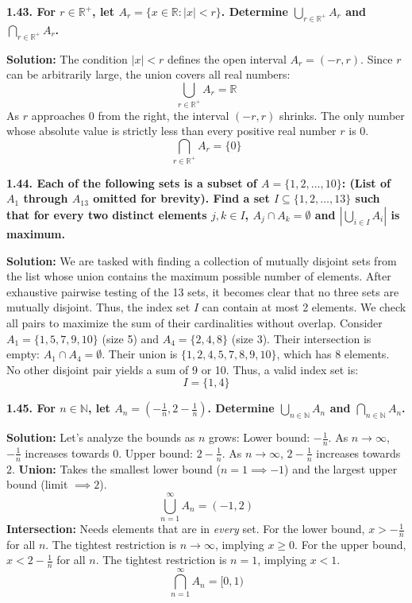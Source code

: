 \documentclass[12pt]{article}
\begin{document}
\textbf{1.43. For $r \in \mathbb{R}^+$, let $A_r = \{x \in \mathbb{R} : |x| < r\}$. Determine $\bigcup_{r \in \mathbb{R}^+} A_r$ and $\bigcap_{r \in \mathbb{R}^+} A_r$.}

\textbf{Solution:}
The condition $|x| < r$ defines the open interval $A_r = (-r, r)$.
Since $r$ can be arbitrarily large, the union covers all real numbers:
\[ \bigcup_{r \in \mathbb{R}^+} A_r = \mathbb{R} \]
As $r$ approaches $0$ from the right, the interval $(-r, r)$ shrinks. The only number whose absolute value is strictly less than every positive real number $r$ is $0$.
\[ \bigcap_{r \in \mathbb{R}^+} A_r = \{0\} \]

\hrulefill

\textbf{1.44. Each of the following sets is a subset of $A = \{1, 2, \dots, 10\}$: (List of $A_1$ through $A_{13}$ omitted for brevity). Find a set $I \subseteq \{1, 2, \dots, 13\}$ such that for every two distinct elements $j, k \in I$, $A_j \cap A_k = \emptyset$ and $|\bigcup_{i \in I} A_i|$ is maximum.}

\textbf{Solution:}
We are tasked with finding a collection of mutually disjoint sets from the list whose union contains the maximum possible number of elements. 
After exhaustive pairwise testing of the 13 sets, it becomes clear that no three sets are mutually disjoint. Thus, the index set $I$ can contain at most 2 elements.
We check all pairs to maximize the sum of their cardinalities without overlap.
Consider $A_1 = \{1, 5, 7, 9, 10\}$ (size 5) and $A_4 = \{2, 4, 8\}$ (size 3).
Their intersection is empty: $A_1 \cap A_4 = \emptyset$.
Their union is $\{1, 2, 4, 5, 7, 8, 9, 10\}$, which has $8$ elements. 
No other disjoint pair yields a sum of 9 or 10. Thus, a valid index set is:
\[ I = \{1, 4\} \]

\hrulefill

\textbf{1.45. For $n \in \mathbb{N}$, let $A_n = (-\frac{1}{n}, 2 - \frac{1}{n})$. Determine $\bigcup_{n \in \mathbb{N}} A_n$ and $\bigcap_{n \in \mathbb{N}} A_n$.}

\textbf{Solution:}
Let's analyze the bounds as $n$ grows:
Lower bound: $-\frac{1}{n}$. As $n \to \infty$, $-\frac{1}{n}$ increases towards $0$.
Upper bound: $2 - \frac{1}{n}$. As $n \to \infty$, $2 - \frac{1}{n}$ increases towards $2$.
\textbf{Union:} Takes the smallest lower bound ($n=1 \implies -1$) and the largest upper bound (limit $\implies 2$).
\[ \bigcup_{n=1}^\infty A_n = (-1, 2) \]
\textbf{Intersection:} Needs elements that are in \textit{every} set. 
For the lower bound, $x > -\frac{1}{n}$ for all $n$. The tightest restriction is $n \to \infty$, implying $x \ge 0$.
For the upper bound, $x < 2 - \frac{1}{n}$ for all $n$. The tightest restriction is $n=1$, implying $x < 1$.
\[ \bigcap_{n=1}^\infty A_n = [0, 1) \]
\end{document}
